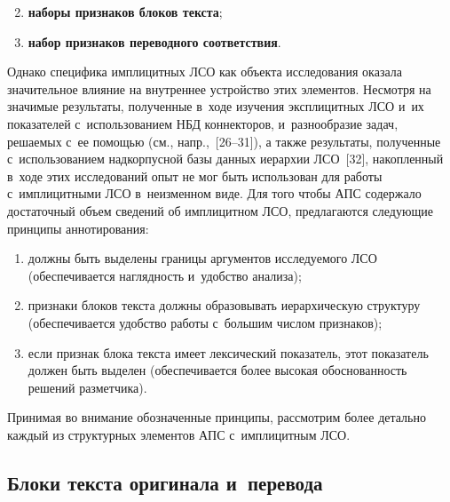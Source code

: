 \begin{multicols}{2}

\noindent
\begin{enumerate}[(1)]
\setcounter{enumi}{1}
\item \textbf{наборы признаков блоков текста};
\item \textbf{набор признаков переводного соответствия}.
\end{enumerate}

Однако специфика имплицитных ЛСО как объекта исследования оказала 
значительное влияние на внутреннее устройство этих элементов. Не\-смот\-ря 
на значимые результаты, полученные в~ходе изуче\-ния эксплицитных ЛСО и~их показателей 
с~использованием НБД коннекторов, 
и~разнообразие задач, решаемых с~ее по\-мощью (см., напр.,~[26--31]), а также 
результаты, полученные с~использованием надкорпусной базы данных 
иерархии ЛСО~[32], накопленный в~ходе этих исследований опыт не мог 
быть использован для работы с~имплицитными ЛСО в~неизменном виде. Для 
того чтобы АПС содержало достаточный объем сведений об имплицитном 
ЛСО, предлагаются следующие принципы аннотирования:
\begin{enumerate}[(1)]
\item должны быть выделены границы аргументов исследуемого ЛСО 
(обеспечивается наглядность и~удобство анализа);
\item признаки блоков текста должны образовывать иерархическую 
структуру (обеспечивается удобство работы с~большим числом признаков);
\item если признак блока текста имеет лексический показатель, этот 
показатель должен быть выделен (обеспечивается более высокая 
обоснованность решений разметчика).
\end{enumerate}

Принимая во внимание обозначенные принципы, рассмотрим более детально 
каждый из структурных элементов АПС с~имплицитным ЛСО.

\subsection{Блоки текста оригинала и~перевода}


\end{multicols}
